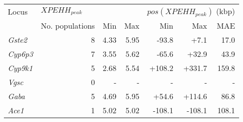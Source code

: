 \begin{tabular}{lrrrrrr}
\toprule
           Locus & \multicolumn{3}{l}{$XPEHH_{peak}$} & \multicolumn{3}{l}{$pos(XPEHH_{peak})$ (kbp)} \\
                 & No. populations &  Min &  Max &                       Min &    Max &   MAE \\
\midrule
  \textit{Gste2} &               8 & 4.33 & 5.95 &                     -93.8 &   +7.1 &  17.0 \\
 \textit{Cyp6p3} &               7 & 3.55 & 5.62 &                     -65.6 &  +32.9 &  43.9 \\
 \textit{Cyp9k1} &               5 & 2.68 & 5.54 &                    +108.2 & +331.7 & 159.8 \\
   \textit{Vgsc} &               0 &    - &    - &                         - &      - &     - \\
   \textit{Gaba} &               5 & 4.69 & 5.95 &                     +54.6 & +114.6 &  86.8 \\
   \textit{Ace1} &               1 & 5.02 & 5.02 &                    -108.1 & -108.1 & 108.1 \\
\bottomrule
\end{tabular}
